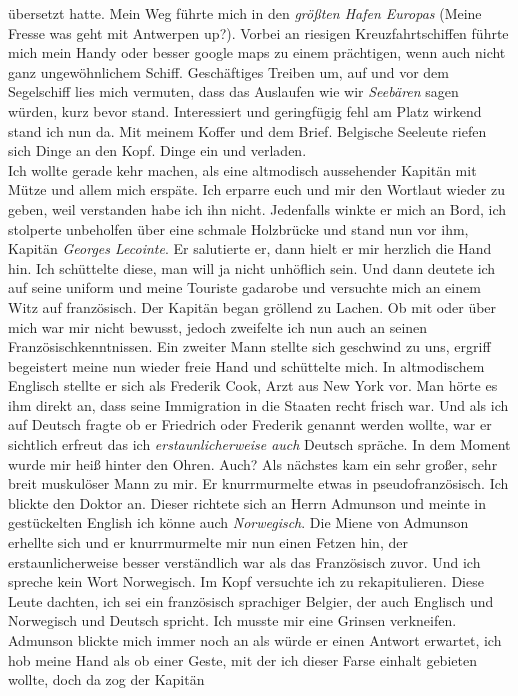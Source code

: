 \documentclass{article}
\begin{document}
übersetzt hatte. Mein Weg führte mich in den \textit{ größten Hafen Europas } (Meine Fresse was geht mit Antwerpen
up?). Vorbei an riesigen Kreuzfahrtschiffen führte mich mein Handy oder besser google maps zu einem prächtigen,
wenn auch nicht ganz ungewöhnlichem Schiff. Geschäftiges Treiben um, auf und vor dem Segelschiff lies mich
vermuten, dass das Auslaufen wie wir \textit{Seebären} sagen würden, kurz bevor stand. Interessiert und
geringfügig fehl am Platz wirkend stand ich nun da. Mit meinem Koffer und dem Brief. Belgische Seeleute riefen
sich Dinge an den Kopf. Dinge ein und verladen.
\\
\noindent 
Ich wollte gerade kehr machen, als eine altmodisch aussehender
Kapitän mit Mütze und allem mich erspäte. Ich erparre euch und mir den Wortlaut wieder zu geben, weil verstanden
habe ich ihn nicht. Jedenfalls winkte er mich an Bord, ich stolperte unbeholfen über eine schmale Holzbrücke und
stand nun vor ihm, Kapitän \textit{Georges Lecointe}. Er salutierte er, dann hielt er mir herzlich die Hand hin.
Ich schüttelte diese, man will ja nicht unhöflich sein. Und dann deutete ich auf seine uniform und meine
Touriste gadarobe und versuchte mich an einem Witz auf französisch. Der Kapitän began gröllend zu Lachen. Ob mit
oder über mich war mir nicht bewusst, jedoch zweifelte ich nun auch an seinen Französischkenntnissen. Ein
zweiter Mann stellte sich geschwind zu uns, ergriff begeistert meine nun wieder freie Hand und schüttelte mich.
In altmodischem Englisch stellte er sich als Frederik Cook, Arzt aus New York vor. Man hörte es ihm direkt an,
dass seine Immigration in die Staaten recht frisch war. Und als ich auf Deutsch fragte ob er Friedrich oder
Frederik genannt werden wollte, war er sichtlich erfreut das ich \textit{erstaunlicherweise auch} Deutsch spräche.
In dem Moment wurde mir heiß hinter den Ohren. Auch? Als nächstes kam ein sehr großer, sehr breit muskulöser
Mann zu mir. Er knurrmurmelte etwas in pseudofranzösisch. Ich blickte den Doktor an. Dieser richtete sich an
Herrn Admunson und meinte in gestückelten English ich könne auch \textit{Norwegisch}. Die Miene von Admunson
erhellte sich und er knurrmurmelte mir nun einen Fetzen hin, der erstaunlicherweise besser verständlich war als
das Französisch zuvor. Und ich spreche kein Wort Norwegisch. Im Kopf versuchte ich zu rekapitulieren. Diese
Leute dachten, ich sei ein französisch sprachiger Belgier, der auch Englisch und Norwegisch und Deutsch spricht.
Ich musste mir eine Grinsen verkneifen. Admunson blickte mich immer noch an als würde er einen Antwort erwartet,
ich hob meine Hand als ob einer Geste, mit der ich dieser Farse einhalt gebieten wollte, doch da zog der Kapitän
\end{document}
